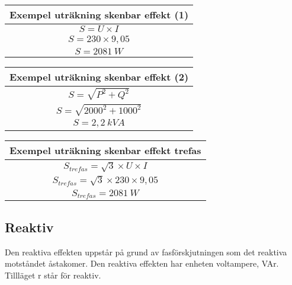\documentclass[
]{book}
\begin{document}
\begin{longtable}[]{@{}c@{}}
\toprule()
Exempel uträkning skenbar effekt (1) \\
\midrule()
\endhead
\( S=U \times I \) \\
\( S=230 \times 9,05 \) \\
\( S=2081 \ W \) \\
\bottomrule()
\end{longtable}

\begin{longtable}[]{@{}c@{}}
\toprule()
Exempel uträkning skenbar effekt (2) \\
\midrule()
\endhead
\( S= \sqrt{P^2 + Q^2} \) \\
\( S= \sqrt{2000^2 + 1000^2} \) \\
\( S=2,2 \ kVA \) \\
\bottomrule()
\end{longtable}

\begin{longtable}[]{@{}c@{}}
\toprule()
Exempel uträkning skenbar effekt trefas \\
\midrule()
\endhead
\( S_{trefas}= \sqrt{3} \times U \times I \) \\
\( S_{trefas}= \sqrt{3} \times 230 \times 9,05 \) \\
\( S_{trefas}=2081 \ W \) \\
\bottomrule()
\end{longtable}

\hypertarget{reaktiv}{%
\subsection{Reaktiv}\label{reaktiv}}

Den reaktiva effekten uppstår på grund av fasförskjutningen som det reaktiva motståndet åstakomer. Den reaktiva effekten har enheten voltampere, VAr. Tillläget r står för reaktiv.
\end{document}
